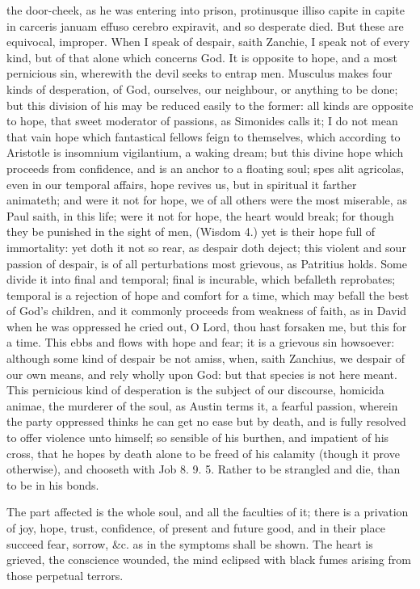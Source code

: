 {the door-cheek, as he was entering into prison, protinusque illiso
capite in capite in carceris januam effuso cerebro expiravit, and so
desperate died. But these are equivocal, improper. When I speak of
despair, saith Zanchie, I speak not of every kind, but of that
alone which concerns God. It is opposite to hope, and a most pernicious
sin, wherewith the devil seeks to entrap men. Musculus makes four kinds
of desperation, of God, ourselves, our neighbour, or anything to be
done; but this division of his may be reduced easily to the former: all
kinds are opposite to hope, that sweet moderator of passions, as
Simonides calls it; I do not mean that vain hope which fantastical
fellows feign to themselves, which according to Aristotle is insomnium
vigilantium, a waking dream; but this divine hope which proceeds from
confidence, and is an anchor to a floating soul; spes alit agricolas,
even in our temporal affairs, hope revives us, but in spiritual it
farther animateth; and were it not for hope, we of all others were the
most miserable, as Paul saith, in this life; were it not for hope, the
heart would break; for though they be punished in the sight of men,
(Wisdom  4.) yet is their hope full of immortality: yet doth it not
so rear, as despair doth deject; this violent and sour passion of
despair, is of all perturbations most grievous, as Patritius
holds. Some divide it into final and temporal; final is
incurable, which befalleth reprobates; temporal is a rejection of hope
and comfort for a time, which may befall the best of God's children,
and it commonly proceeds from weakness of faith, as in David when
he was oppressed he cried out, O Lord, thou hast forsaken me, but this
for a time. This ebbs and flows with hope and fear; it is a grievous
sin howsoever: although some kind of despair be not amiss, when, saith
Zanchius, we despair of our own means, and rely wholly upon God: but
that species is not here meant. This pernicious kind of desperation is
the subject of our discourse, homicida animae, the murderer of the
soul, as Austin terms it, a fearful passion, wherein the party
oppressed thinks he can get no ease but by death, and is fully resolved
to offer violence unto himself; so sensible of his burthen, and
impatient of his cross, that he hopes by death alone to be freed of his
calamity (though it prove otherwise), and chooseth with Job  8. 9.
 5. Rather to be strangled and die, than to be in his bonds.

The part affected is the whole soul, and all the faculties of it;
there is a privation of joy, hope, trust, confidence, of present and
future good, and in their place succeed fear, sorrow, \&c. as in the
symptoms shall be shown. The heart is grieved, the conscience wounded,
the mind eclipsed with black fumes arising from those perpetual
terrors.

}
